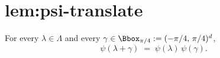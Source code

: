 \chapter{lem:psi-translate}\label{chap:lem_psi_translate}
\begin{lemma}
\label{lem:psi-translate}
For every $\lambda \in \Lambda$ and every $\gamma \in \Bbox_{\pi/4}
:= (-\pi/4,\,\pi/4)^d$,
\[
  \psi(\lambda + \gamma) \;=\; \psi(\lambda)\,\psi(\gamma).
\]
\end{lemma}
